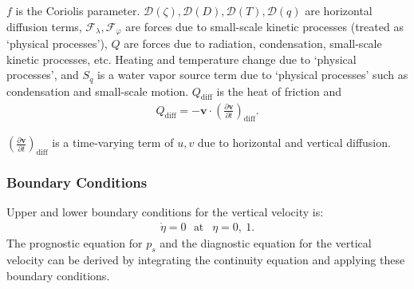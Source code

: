 \(f\) is the Coriolis parameter. \({\mathcal D}(\zeta), {\mathcal D}(D), {\mathcal D}(T), {\mathcal D}(q)\) are horizontal diffusion terms, \({\mathcal F}_\lambda, {\mathcal F}_\varphi\) are forces
due to small-scale kinetic processes (treated as `physical processes'), \(Q\) are forces due to radiation, condensation, small-scale kinetic processes, etc. Heating and temperature change due to
`physical processes', and \(S_q\) is a water vapor source term due to `physical processes' such as condensation and small-scale motion. \(Q_{\mathrm{diff}}\) is the heat of friction and \begin{eqnarray}
  Q_{\mathrm{diff}}
 = - {\mathbf{v}} \cdot  \left( \frac{\partial {\mathbf{v}}}{\partial t} \right)_{\mathrm{diff}} .  \end{eqnarray}

\(( \frac{\partial {\mathbf{v}}}{\partial t} )_{\mathrm{diff}}\) is a time-varying term of \(u,v\) due to horizontal and vertical diffusion.

\hypertarget{boundary-conditions}{%
\subsubsection{Boundary Conditions}\label{boundary-conditions}}

Upper and lower boundary conditions for the vertical velocity is: \begin{eqnarray}
  \dot{\eta} = 0  \ \ \ \text{at~} \ \ \eta = 0 , \ 1 .  \end{eqnarray} The prognostic equation for \(p_s\) and the diagnostic equation for the vertical velocity can be derived by integrating the continuity
equation and applying these boundary conditions.
